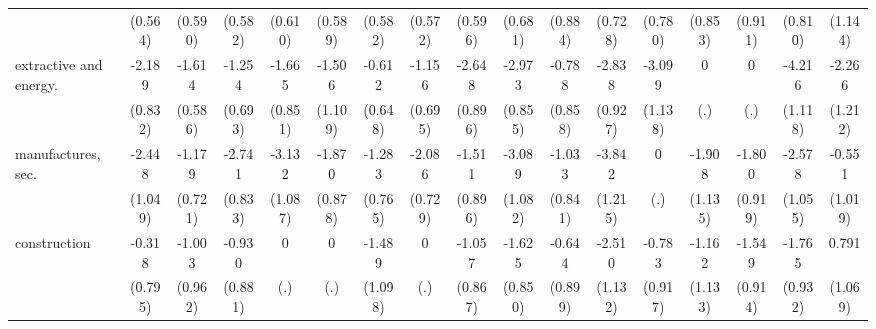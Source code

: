 {\begin{tabular}{l*{16}{c}}
                    &     (0.564)         &     (0.590)         &     (0.582)         &     (0.610)         &     (0.589)         &     (0.582)         &     (0.572)         &     (0.596)         &     (0.681)         &     (0.884)         &     (0.728)         &     (0.780)         &     (0.853)         &     (0.911)         &     (0.810)         &     (1.144)         \\
[1em]
extractive and energy.&      -2.189\sym{**} &      -1.614\sym{**} &      -1.254         &      -1.665         &      -1.506         &      -0.612         &      -1.156         &      -2.648\sym{**} &      -2.973\sym{***}&      -0.788         &      -2.838\sym{**} &      -3.099\sym{**} &           0         &           0         &      -4.216\sym{***}&      -2.266         \\
                    &     (0.832)         &     (0.586)         &     (0.693)         &     (0.851)         &     (1.109)         &     (0.648)         &     (0.695)         &     (0.896)         &     (0.855)         &     (0.858)         &     (0.927)         &     (1.138)         &         (.)         &         (.)         &     (1.118)         &     (1.212)         \\
[1em]
manufactures, sec.  &      -2.448\sym{*}  &      -1.179         &      -2.741\sym{***}&      -3.132\sym{**} &      -1.870\sym{*}  &      -1.283         &      -2.086\sym{**} &      -1.511         &      -3.089\sym{**} &      -1.033         &      -3.842\sym{**} &           0         &      -1.908         &      -1.800         &      -2.578\sym{*}  &      -0.551         \\
                    &     (1.049)         &     (0.721)         &     (0.833)         &     (1.087)         &     (0.878)         &     (0.765)         &     (0.729)         &     (0.896)         &     (1.082)         &     (0.841)         &     (1.215)         &         (.)         &     (1.135)         &     (0.919)         &     (1.055)         &     (1.019)         \\
[1em]
construction        &      -0.318         &      -1.003         &      -0.930         &           0         &           0         &      -1.489         &           0         &      -1.057         &      -1.625         &      -0.644         &      -2.510\sym{*}  &      -0.783         &      -1.162         &      -1.549         &      -1.765         &       0.791         \\
                    &     (0.795)         &     (0.962)         &     (0.881)         &         (.)         &         (.)         &     (1.098)         &         (.)         &     (0.867)         &     (0.850)         &     (0.899)         &     (1.132)         &     (0.917)         &     (1.133)         &     (0.914)         &     (0.932)         &     (1.069)         \\

\end{tabular}}
